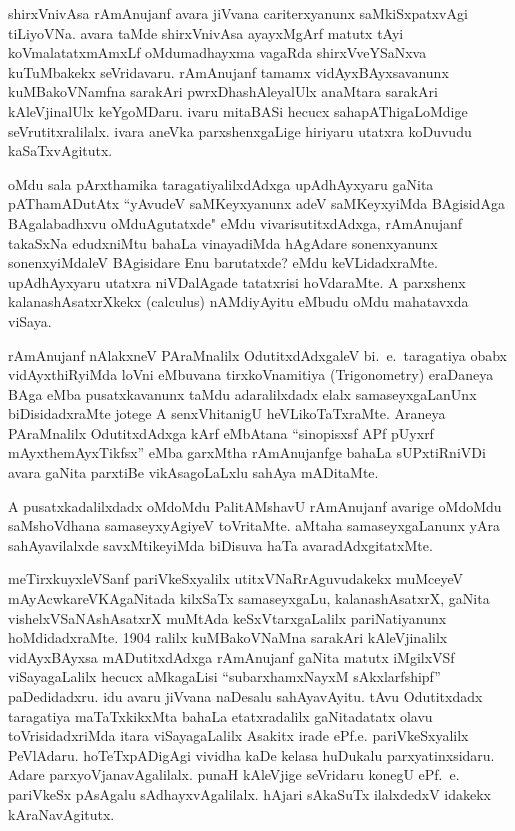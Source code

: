 shirxVnivAsa rAmAnujanf avara jiVvana cariterxyanunx saMkiSxpatxvAgi tiLiyoVNa. avara taMde shirxVnivAsa ayayxMgArf matutx tAyi koVmalatatxmAmxLf oMdu\break madhayxma vagaRda shirxVveYSaNxva kuTuMbakekx seVridavaru. rAmAnujanf tamamx vidAyxBAyxsa\-vanunx kuMBakoVNamfna sarakAri pwrxDhashAleyalUlx anaMtara sarakAri kAleVjinalUlx keYgoMDaru. ivaru mitaBASi hecucx sahapAThigaLoMdige seVrutitxralilalx. ivara aneVka parxshenxgaLige hiriyaru utatxra koDuvudu kaSaTxvAgitutx.

oMdu sala pArxthamika taragatiyalilxdAdxga upAdhAyxyaru gaNita pATha\-mADutAtx ``yAvudeV saMKeyxyanunx adeV saMKeyxyiMda BAgisidAga BAgalabadhxvu oMdu\break Agutatxde" eMdu vivarisutitxdAdxga, rAmAnujanf takaSxNa edudxniMtu bahaLa vinayadiMda hAgAdare sonenxyanunx sonenxyiMdaleV BAgisidare Enu barutatxde? eMdu keVLidadxraMte. upAdhAyxyaru utatxra niVDalAgade tatatxrisi hoVdaraMte. A parxshenx kalanashAsatxrXkekx {\rm (calculus)} nAMdiyAyitu eMbudu oMdu mahatavxda viSaya. 

rAmAnujanf nAlakxneV PAraMnalilx OdutitxdAdxgaleV bi.~e.~taragatiya obabx vidAyxthiRyiMda loVni eMbuvana tirxkoVnamitiya {\rm (Trigonometry)} eraDaneya BAga eMba pusatxkavanunx taMdu adaralilxdadx elalx samaseyxgaLanUnx biDisidadxraMte jotege A senxVhita\-nigU heVLikoTaTxraMte. Araneya PAraMnalilx OdutitxdAdxga kArf eMbAtana ``sinopisxsf APf pUyxrf mAyxthemAyxTikfsx'' eMba garxMtha rAmAnujanfge bahaLa sUPxtiRniVDi avara gaNita parxtiBe vikAsagoLaLxlu sahAya mADitaMte.

A pusatxkadalilxdadx oMdoMdu PalitAMshavU rAmAnujanf avarige oMdoMdu saMshoVdhana samaseyxyAgiyeV toVritaMte. aMtaha samaseyxgaLanunx yAra sahAya\-vilalxde savxMtikeyiMda biDisuva haTa avaradAdxgitatxMte.

meTirxkuyxleVSanf pariVkeSxyalilx utitxVNaRrAguvudakekx muMceyeV mAyAcwka\break reVKAgaNitada kilxSaTx samaseyxgaLu, kalanashAsatxrX, gaNita vishelxVSaNAshAsatxrX muMtAda keSxVtarxgaLalilx pariNatiyanunx hoMdidadxraMte. {\rm 1904} ralilx kuMBakoVNaMna sarakAri kAleVjinalilx vidAyxBAyxsa mADutitxdAdxga rAmAnujanf gaNita matutx iMgilxVSf viSayagaLalilx hecucx aMkagaLisi ``subarxhamxNayxM sAkxlarfshipf'' paDedidadxru. idu avaru jiVvana naDesalu sahAyavAyitu. tAvu Odutitxdadx taragatiya maTaTxkikxMta bahaLa etatxradalilx gaNita\-datatx olavu toVrisidadxriMda itara viSayagaLalilx Asakitx irade ePf.e. pariVkeSxyalilx PeVlAdaru. hoTeTxpADigAgi vividha kaDe kelasa huDukalu parxyatinxsidaru. Adare parxyoVjanavAgalilalx. punaH kAleVjige seVridaru konegU ePf.~e. pariVkeSx pAsAgalu sAdhayxvAgalilalx. hAjari sAkaSuTx ilalxdedxV idakekx kAraNavAgitutx.

